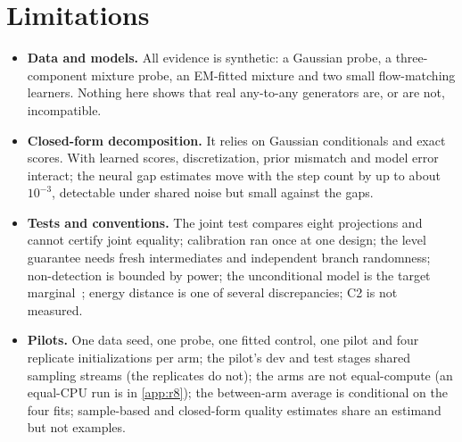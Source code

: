 \documentclass{article}
\theoremstyle{plain}
\theoremstyle{definition}
\theoremstyle{remark}
\begin{document}
\section{Limitations}
\label{sec:limits}
\begin{itemize}
\item \textbf{Data and models.} All evidence is synthetic: a Gaussian probe, a three-component mixture probe, an EM-fitted mixture and two small flow-matching learners. Nothing here shows that real any-to-any generators are, or are not, incompatible.
\item \textbf{Closed-form decomposition.} It relies on Gaussian conditionals and exact scores. With learned scores, discretization, prior mismatch and model error interact; the neural gap estimates move with the step count by up to about $10^{-3}$, detectable under shared noise but small against the gaps.
\item \textbf{Tests and conventions.} The joint test compares eight projections and cannot certify joint equality; calibration ran once at one design; the level guarantee needs fresh intermediates and independent branch randomness; non-detection is bounded by power; the unconditional model is the target marginal~\citep{bao2023unidiffuser}; energy distance is one of several discrepancies; C2 is not measured.
\item \textbf{Pilots.} One data seed, one probe, one fitted control, one pilot and four replicate initializations per arm; the pilot's dev and test stages shared sampling streams (the replicates do not); the arms are not equal-compute (an equal-CPU run is in \cref{app:r8}); the between-arm average is conditional on the four fits; sample-based and closed-form quality estimates share an estimand but not examples.
\end{itemize}

\end{document}
